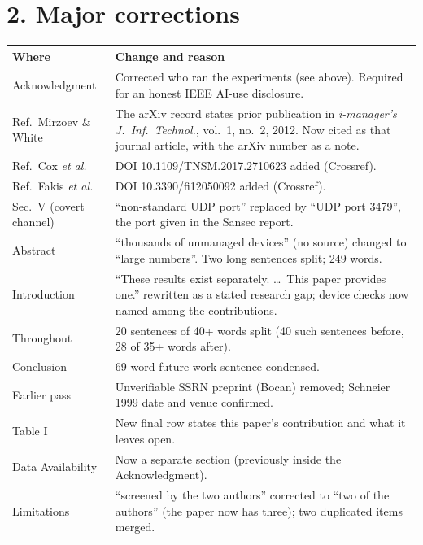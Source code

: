 \documentclass[10pt,a4paper]{article}
\begin{document}
\section*{2. Major corrections}
\begin{tabularx}{\textwidth}{@{}L{3.2cm}Y@{}}
\toprule
\textbf{Where} & \textbf{Change and reason} \\
\midrule
Acknowledgment & Corrected who ran the experiments (see above). Required for an honest IEEE AI-use disclosure. \\
Ref.\ Mirzoev \& White & The arXiv record states prior publication in \textit{i-manager's J.\ Inf.\ Technol.}, vol.~1, no.~2, 2012. Now cited as that journal article, with the arXiv number as a note. \\
Ref.\ Cox \emph{et al.} & DOI 10.1109/TNSM.2017.2710623 added (Crossref). \\
Ref.\ Fakis \emph{et al.} & DOI 10.3390/fi12050092 added (Crossref). \\
Sec.\ V (covert channel) & ``non-standard UDP port'' replaced by ``UDP port 3479'', the port given in the Sansec report. \\
Abstract & ``thousands of unmanaged devices'' (no source) changed to ``large numbers''. Two long sentences split; 249 words. \\
Introduction & ``These results exist separately. \ldots\ This paper provides one.'' rewritten as a stated research gap; device checks now named among the contributions. \\
Throughout & 20 sentences of 40+ words split (40 such sentences before, 28 of 35+ words after). \\
Conclusion & 69-word future-work sentence condensed. \\
Earlier pass & Unverifiable SSRN preprint (Bocan) removed; Schneier 1999 date and venue confirmed. \\
Table I & New final row states this paper's contribution and what it leaves open. \\
Data Availability & Now a separate section (previously inside the Acknowledgment). \\
Limitations & ``screened by the two authors'' corrected to ``two of the authors'' (the paper now has three); two duplicated items merged. \\
\bottomrule
\end{tabularx}
\end{document}
